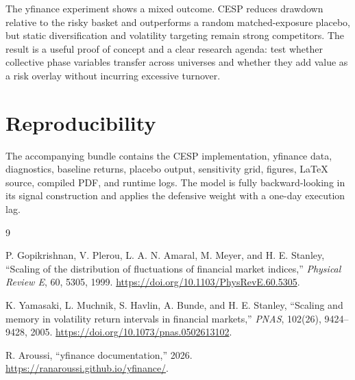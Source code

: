 \documentclass[11pt]{article}
\begin{document}
The yfinance experiment shows a mixed outcome. CESP reduces drawdown relative
to the risky basket and outperforms a random matched-exposure placebo, but static
diversification and volatility targeting remain strong competitors. The result is
a useful proof of concept and a clear research agenda: test whether collective
phase variables transfer across universes and whether they add value as a risk
overlay without incurring excessive turnover.

\appendix

\section{Reproducibility}

The accompanying bundle contains the CESP implementation, yfinance data,
diagnostics, baseline returns, placebo output, sensitivity grid, figures,
LaTeX source, compiled PDF, and runtime logs. The model is fully backward-looking
in its signal construction and applies the defensive weight with a one-day
execution lag.

\begin{thebibliography}{9}

P. Gopikrishnan, V. Plerou, L. A. N. Amaral, M. Meyer, and H. E. Stanley,
``Scaling of the distribution of fluctuations of financial market indices,''
\emph{Physical Review E}, 60, 5305, 1999.
\url{https://doi.org/10.1103/PhysRevE.60.5305}.

K. Yamasaki, L. Muchnik, S. Havlin, A. Bunde, and H. E. Stanley,
``Scaling and memory in volatility return intervals in financial markets,''
\emph{PNAS}, 102(26), 9424--9428, 2005.
\url{https://doi.org/10.1073/pnas.0502613102}.

R. Aroussi, ``yfinance documentation,'' 2026.
\url{https://ranaroussi.github.io/yfinance/}.

\end{thebibliography}
\end{document}
